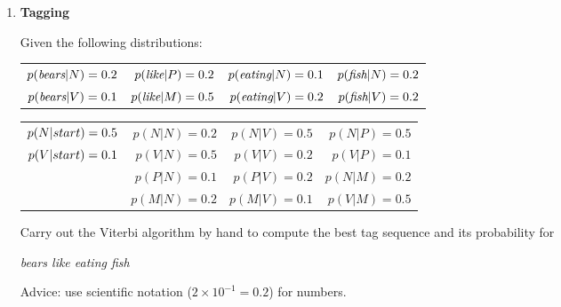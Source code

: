 \documentclass[12pt]{article}
\begin{document}
\begin{enumerate}
\newpage

\item {\bf Tagging}

Given the following distributions:

{\small \begin{tabular}{rrrr}


$p(\text{\em bears}|N) = 0.2$ & $p(\text{\em like}|P) = 0.2$ & $p(\text{\em eating}|N) = 0.1$  &$p(\text{\em fish}|N) = 0.2$  \\
$p(\text{\em bears}|V) = 0.1$ & $p(\text{\em like}|M) = 0.5$ & $p(\text{\em eating}|V) = 0.2$ & $p(\text{\em fish}|V) = 0.2$  \\
\end{tabular}}

{\small \begin{tabular}{rrrr}
$p(N|{\sc start}) = 0.5$ & $p(N|N) = 0.2$ & $p(N|V) = 0.5$ & $p(N|P) = 0.5$  \\
$p(V|{\sc start}) = 0.1$ & $p(V|N) = 0.5$ & $p(V|V) = 0.2$ & $p(V|P) = 0.1$  \\
                                           & $p(P|N) = 0.1$ & $p(P|V) = 0.2$ & $p(N|M) = 0.2$   \\
                                           & $p(M|N) = 0.2$ & $p(M|V) = 0.1$ & $p(V|M) = 0.5$   \\
\end{tabular}}

Carry out the Viterbi algorithm by hand to compute the best tag sequence and its probability for 
\begin{center}
{\em bears like eating fish }
\end{center}
Advice: use scientific notation ($2\times10^{-1} = 0.2$) for numbers.



\end{enumerate}
\end{document}
